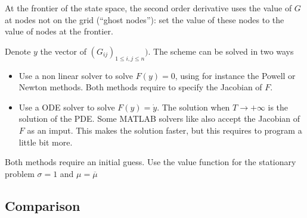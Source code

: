 \documentclass[english]{article}
\begin{document}
At the frontier of the state space, the second order derivative uses the value of $G$ at nodes not on the grid (``ghost nodes''): set the value of these nodes to the value of nodes at the frontier.


Denote $y$ the vector of  $(G_{ij})_{1 \leq i,j\leq n})$. The scheme can be solved in two ways
\begin{itemize}
	\item Use a non linear solver to solve $F(y) = 0$, using for instance the Powell or Newton methods. Both methods require to specify the Jacobian of $F$. 
	\item Use a ODE solver to solve $F(y) = \dot{y}$. The solution when $T\rightarrow +\infty$ is the solution of the PDE. Some MATLAB solvers like  also accept  the Jacobian of $F$ as an imput. This makes the solution faster, but this requires to program a little bit more.
\end{itemize}

Both methods require an initial guess. Use the value function for the stationary problem $\sigma = 1$ and $\mu = \overline{\mu}$


\subsection{Comparison}
\end{document}
